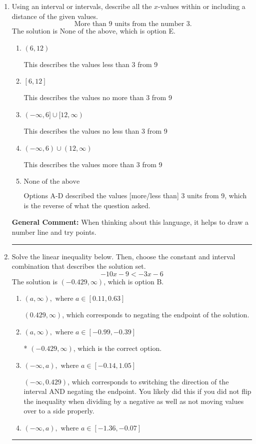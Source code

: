 \documentclass{extbook}[14pt]
\newcommand{\litem}[1]{\item #1

\rule{\textwidth}{0.4pt}}
\begin{document}
\begin{enumerate}\litem{
Using an interval or intervals, describe all the $x$-values within or including a distance of the given values.
\[ \text{ More than } 9 \text{ units from the number } 3. \]The solution is \( \text{None of the above} \), which is option E.\begin{enumerate}[label=\Alph*.]
\item \( (6, 12) \)

This describes the values less than 3 from 9
\item \( [6, 12] \)

This describes the values no more than 3 from 9
\item \( (-\infty, 6] \cup [12, \infty) \)

This describes the values no less than 3 from 9
\item \( (-\infty, 6) \cup (12, \infty) \)

This describes the values more than 3 from 9
\item \( \text{None of the above} \)

Options A-D described the values [more/less than] 3 units from 9, which is the reverse of what the question asked.
\end{enumerate}

\textbf{General Comment:} When thinking about this language, it helps to draw a number line and try points.
}
\litem{
Solve the linear inequality below. Then, choose the constant and interval combination that describes the solution set.
\[ -10x -9 < -3x -6 \]The solution is \( (-0.429, \infty) \), which is option B.\begin{enumerate}[label=\Alph*.]
\item \( (a, \infty), \text{ where } a \in [0.11, 0.63] \)

 $(0.429, \infty)$, which corresponds to negating the endpoint of the solution.
\item \( (a, \infty), \text{ where } a \in [-0.99, -0.39] \)

* $(-0.429, \infty)$, which is the correct option.
\item \( (-\infty, a), \text{ where } a \in [-0.14, 1.05] \)

 $(-\infty, 0.429)$, which corresponds to switching the direction of the interval AND negating the endpoint. You likely did this if you did not flip the inequality when dividing by a negative as well as not moving values over to a side properly.
\item \( (-\infty, a), \text{ where } a \in [-1.36, -0.07] \)


\end{enumerate}}
\end{enumerate}
\end{document}

